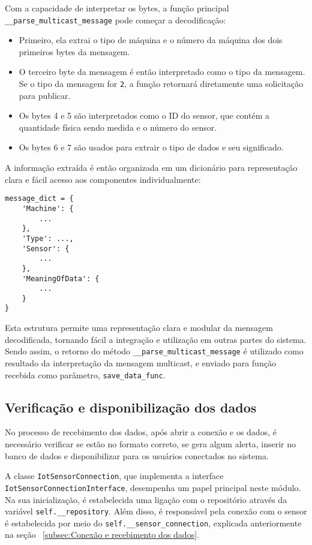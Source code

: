 Com a capacidade de interpretar os bytes, a função principal \texttt{\_\_parse\_multicast\_message} pode começar a decodificação:

\begin{itemize}
    \item Primeiro, ela extrai o tipo de máquina e o número da máquina dos dois primeiros bytes da mensagem.
    
    \item O terceiro byte da mensagem é então interpretado como o tipo da mensagem. Se o tipo da mensagem for \texttt{2}, a função retornará diretamente uma solicitação para publicar.
    
    \item Os bytes 4 e 5 são interpretados como o ID do sensor, que contém a quantidade física sendo medida e o número do sensor.
    
    \item Os bytes 6 e 7 são usados para extrair o tipo de dados e seu significado.
\end{itemize}

A informação extraída é então organizada em um dicionário para representação clara e fácil acesso aos componentes individualmente:

\begin{verbatim}
message_dict = {
    'Machine': {
        ...
    },
    'Type': ...,
    'Sensor': {
        ...
    },
    'MeaningOfData': {
        ...
    }
}
\end{verbatim}

Esta estrutura permite uma representação clara e modular da mensagem decodificada, tornando fácil a integração e utilização em outras partes do sistema. Sendo assim, o retorno do método \texttt{\_\_parse\_multicast\_message} é utilizado como resultado da interpretação da mensagem multicast, e enviado para função recebida como parâmetro, \texttt{save\_data\_func}.

\subsection[Verificação e disponibilização dos dados]{Verificação e disponibilização dos dados}
No processo de recebimento dos dados, após abrir a conexão e os dados, é necessário verificar se estão no formato correto, se gera algum alerta, inserir no banco de dados e disponibilizar para os usuários conectados no sistema.

A classe \texttt{IotSensorConnection}, que implementa a interface \texttt{IotSensorConnectionInterface}, desempenha um papel principal neste módulo. Na sua inicialização, é estabelecida uma ligação com o repositório através da variável \texttt{self.\_\_repository}. Além disso, é responsável pela conexão com o sensor é estabelecida por meio do \texttt{self.\_\_sensor\_connection}, explicada anteriormente na seção ~\ref{subsec:Conexão e recebimento dos dados}.

